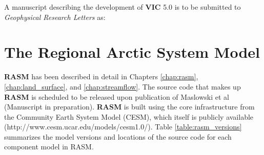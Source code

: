 A manuscript describing the development of \textbf{VIC} 5.0 is to be submitted to \textit{Geophysical Research Letters} as:


\section{The Regional Arctic System Model}
\label{sec:rasm_dev}

\textbf{RASM} has been described in detail in Chapters \ref{chap:rasm}, \ref{chap:land_surface}, and \ref{chap:streamflow}.
The source code that makes up \textbf{RASM} is scheduled to be released upon publication of Maslowski et al (Manuscript in preparation).
\textbf{RASM} is built using the core infrastructure from the Community Earth System Model (CESM), which itself is publicly available (http://www.cesm.ucar.edu/models/cesm1.0/).
Table \ref{table:rasm_versions} summarizes the model versions and locations of the source code for each component model in RASM.

\begin{table}[]
\centering
\caption{Versions and primary citations for core RASM component models.}
\label{table:rasm_versions}
\end{table}

